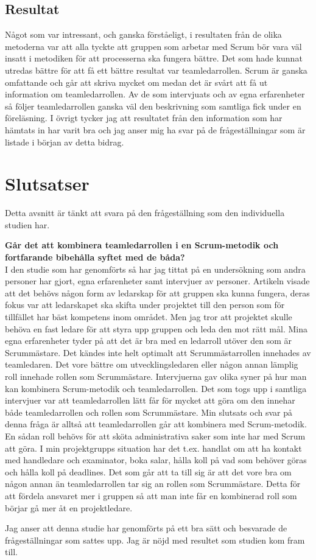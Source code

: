 \subsection{Resultat}
Något som var intressant, och ganska förståeligt, i resultaten från de olika metoderna var att alla tyckte att gruppen som arbetar med Scrum bör vara väl insatt i metodiken för att processerna ska fungera bättre.
Det som hade kunnat utredas bättre för att få ett bättre resultat var teamledarrollen. 
Scrum är ganska omfattande och går att skriva mycket om medan det är svårt att få ut information om teamledarrollen. 
Av de som intervjuats och av egna erfarenheter så följer teamledarrollen ganska väl den beskrivning som samtliga fick under en föreläsning. 
I övrigt tycker jag att resultatet från den information som har hämtats in har varit bra och jag anser mig ha svar på de frågeställningar som är listade i början av detta bidrag.

\section{Slutsatser}
Detta avsnitt är tänkt att svara på den frågeställning som den individuella studien har.

\textbf{Går det att kombinera teamledarrollen i en Scrum-metodik och fortfarande bibehålla syftet med de båda?}\\
I den studie som har genomförts så har jag tittat på en undersökning som andra personer har gjort, egna erfarenheter samt intervjuer av personer. 
Artikeln visade att det behövs någon form av ledarskap för att gruppen ska kunna fungera, deras fokus var att ledarskapet ska skifta under projektet till den person som för tillfället har bäst kompetens inom området. Men jag tror att projektet skulle behöva en fast ledare för att styra upp gruppen och leda den mot rätt mål.
Mina egna erfarenheter tyder på att det är bra med en ledarroll utöver den som är Scrummästare. 
Det kändes inte helt optimalt att Scrummästarrollen innehades av teamledaren. 
Det vore bättre om utvecklingsledaren eller någon annan lämplig roll innehade rollen som Scrummästare. 
Intervjuerna gav olika syner på hur man kan kombinera Scrum-metodik och teamledarrollen. 
Det som togs upp i samtliga intervjuer var att teamledarrollen lätt får för mycket att göra om den innehar både teamledarrollen och rollen som Scrummästare.
Min slutsats och svar på denna fråga är alltså att teamledarrollen går att kombinera med Scrum-metodik. 
En sådan roll behövs för att sköta administrativa saker som inte har med Scrum att göra. 
I min projektgrupps situation har det t.ex. handlat om att ha kontakt med handledare och examinator, boka salar, hålla koll på vad som behöver göras och hålla koll på deadlines. 
Det som går att ta till sig är att det vore bra om någon annan än teamledarrollen tar sig an rollen som Scrummästare. 
Detta för att fördela ansvaret mer i gruppen så att man inte får en kombinerad roll som börjar gå mer åt en projektledare. 

Jag anser att denna studie har genomförts på ett bra sätt och besvarade de frågeställningar som sattes upp. Jag är nöjd med resultet som studien kom fram till.
